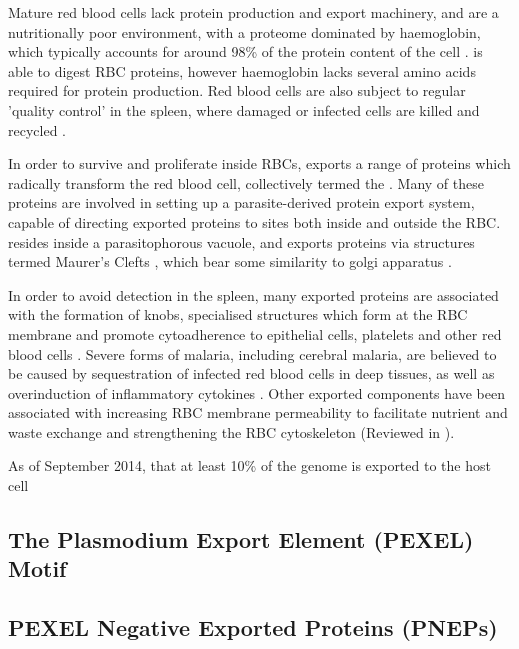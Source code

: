 \documentclass[fleqn,10pt]{SelfArx} %
\begin{document}
Mature red blood cells lack protein production and export machinery, and are a nutritionally poor environment, with a proteome dominated by haemoglobin, which typically accounts for around 98\% of the protein content of the cell \cite{DAlessandro2010}. \pf is able to digest RBC proteins, however haemoglobin lacks several amino acids required for protein production. Red blood cells are also  subject to regular 'quality control' in the spleen, where damaged or infected cells are killed and recycled \cite{Elsworth2014}.

In order to survive and proliferate inside RBCs, \pf exports a range of proteins which radically transform the red blood cell, collectively termed the . Many of these proteins are involved in setting up a parasite-derived protein export system, capable of directing exported \pf proteins to sites both inside and outside the RBC. \pf resides inside a parasitophorous vacuole, and exports proteins via structures termed Maurer's Clefts \cite{Marti2013}, which bear some similarity to golgi apparatus \cite{Mundwiler-Pachlatko2013}.

In order to avoid detection in the spleen, many exported proteins are associated with the formation of knobs, specialised structures which form at the RBC membrane and promote cytoadherence to epithelial cells, platelets and other red blood cells \cite{Kraemer2006}. Severe forms of malaria, including cerebral malaria, are believed to be caused by sequestration of infected red blood cells in deep tissues, as well as overinduction of inflammatory cytokines \cite{Chen2000}. Other exported components have been associated with increasing RBC membrane permeability to facilitate nutrient and waste exchange and strengthening the RBC cytoskeleton (Reviewed in \cite{Elsworth2014}). 

As of September 2014,  that at least 10\% of the \pf genome is exported to the host cell \cite{Boddey2013a}  


\subsection*{The Plasmodium Export Element (PEXEL) Motif}
\subsection*{PEXEL Negative Exported Proteins (PNEPs)}
\end{document}
